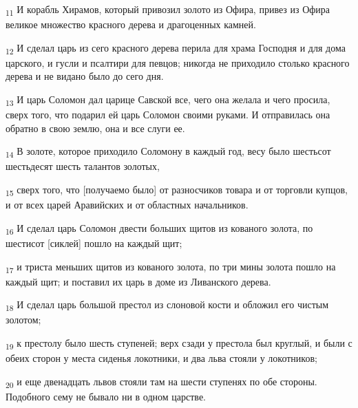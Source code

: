 \begin{tcolorbox}
\textsubscript{11} И корабль Хирамов, который привозил золото из Офира, привез из Офира великое множество красного дерева и драгоценных камней.
\end{tcolorbox}
\begin{tcolorbox}
\textsubscript{12} И сделал царь из сего красного дерева перила для храма Господня и для дома царского, и гусли и псалтири для певцов; никогда не приходило столько красного дерева и не видано было до сего дня.
\end{tcolorbox}
\begin{tcolorbox}
\textsubscript{13} И царь Соломон дал царице Савской все, чего она желала и чего просила, сверх того, что подарил ей царь Соломон своими руками. И отправилась она обратно в свою землю, она и все слуги ее.
\end{tcolorbox}
\begin{tcolorbox}
\textsubscript{14} В золоте, которое приходило Соломону в каждый год, весу было шестьсот шестьдесят шесть талантов золотых,
\end{tcolorbox}
\begin{tcolorbox}
\textsubscript{15} сверх того, что [получаемо было] от разносчиков товара и от торговли купцов, и от всех царей Аравийских и от областных начальников.
\end{tcolorbox}
\begin{tcolorbox}
\textsubscript{16} И сделал царь Соломон двести больших щитов из кованого золота, по шестисот [сиклей] пошло на каждый щит;
\end{tcolorbox}
\begin{tcolorbox}
\textsubscript{17} и триста меньших щитов из кованого золота, по три мины золота пошло на каждый щит; и поставил их царь в доме из Ливанского дерева.
\end{tcolorbox}
\begin{tcolorbox}
\textsubscript{18} И сделал царь большой престол из слоновой кости и обложил его чистым золотом;
\end{tcolorbox}
\begin{tcolorbox}
\textsubscript{19} к престолу было шесть ступеней; верх сзади у престола был круглый, и были с обеих сторон у места сиденья локотники, и два льва стояли у локотников;
\end{tcolorbox}
\begin{tcolorbox}
\textsubscript{20} и еще двенадцать львов стояли там на шести ступенях по обе стороны. Подобного сему не бывало ни в одном царстве.
\end{tcolorbox}
